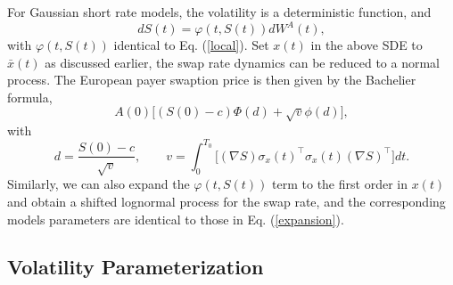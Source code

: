 \documentclass[12pt]{article}
\begin{document}
    For Gaussian short rate models, the volatility is a deterministic function, and
    \begin{equation}
      dS(t) = \varphi(t,S(t)) dW^A(t),
    \end{equation}
    with $\varphi(t,S(t))$ identical to Eq. (\ref{local}).
    Set $x(t)$ in the above SDE to $\bar{x}(t)$ as discussed earlier, the swap rate dynamics can be reduced to
    a normal process. The European payer swaption price is then given by the Bachelier formula,
    \begin{equation}
      A(0)\Big[\left(S(0)-c\right)\Phi(d)+\sqrt{v}\phi(d)\Big],
    \end{equation}
    with
    \begin{equation}
      d=\frac{S(0)-c}{\sqrt{v}},\quad\quad v=\int_0^{T_0}\Big[(\nabla S)\sigma_x(t)^{\top}\sigma_x(t)(\nabla S)^{\top}\Big]dt.
    \end{equation}
    Similarly, we can also expand the $\varphi(t,S(t))$ term to the first order in $x(t)$ and obtain a
    shifted lognormal process for the swap rate, and the corresponding models parameters are identical to those in Eq. (\ref{expansion}).

  \subsection{Volatility Parameterization}
\end{document}

